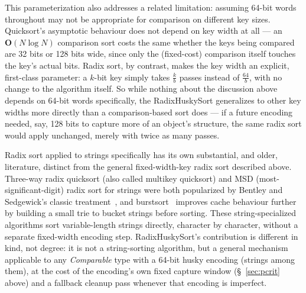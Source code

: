 \documentclass[twoside,leqno,twocolumn]{article}
\begin{document}
This parameterization also addresses a related limitation:
assuming 64-bit words throughout may not be appropriate for comparison on different key sizes.
Quicksort's asymptotic behaviour does not depend on key width at all —
an $\textbf{O}(N \log N)$ comparison sort costs the same whether the keys being compared are 32 bits or 128 bits wide,
since only the (fixed-cost) comparison itself touches the key's actual bits.
Radix sort, by contrast, makes the key width an explicit, first-class parameter:
a $k$-bit key simply takes $\frac{k}{b}$ passes instead of $\frac{64}{b}$, with no change to the algorithm itself.
So while nothing about the discussion above depends on 64-bit words specifically,
the RadixHuskySort generalizes to other key widths more directly than a comparison-based sort does —
if a future encoding needed, say, 128 bits to capture more of an object's structure,
the same radix sort would apply unchanged, merely with twice as many passes.

Radix sort applied to strings specifically has its own substantial, and older, literature,
distinct from the general fixed-width-key radix sort described above.
Three-way radix quicksort (also called multikey quicksort) and MSD (most-significant-digit)
radix sort for strings were both popularized by Bentley and Sedgewick's classic treatment~\cite{314161.314321},
and burstsort~\cite{1064546.1180622} improves cache behaviour further by building a small trie to bucket strings before sorting.
These string-specialized algorithms sort variable-length strings directly, character by character, without a separate fixed-width encoding step.
RadixHuskySort's contribution is different in kind, not degree:
it is not a string-sorting algorithm, but a general mechanism applicable to any \textit{Comparable} type
with a 64-bit husky encoding (strings among them),
at the cost of the encoding's own fixed capture window (\S~\ref{sec:pcrit} above)
and a fallback cleanup pass whenever that encoding is imperfect.
\end{document}
